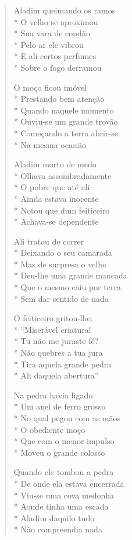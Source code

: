 \begin{verse}
Aladim queimando os ramos\\*
O velho se aproximou\\*
Sua vara de condão\\*
Pelo ar ele vibrou\\*
E ali certos perfumes\\*
Sobre o fogo derramou

O moço ficou imóvel\\*
Prestando bem atenção\\*
Quando naquele momento\\*
Ouviu-se um grande trovão\\*
Começando a terra abrir-se\\*
Na mesma ocasião

Aladim morto de medo\\*
Olhava assombradamente\\*
O pobre que até ali\\*
Ainda estava inocente\\*
Notou que dum feiticeiro\\*
Achava-se dependente

Ali tratou de correr\\*
Deixando o seu camarada\\*
Mas de surpresa o velho\\*
Deu-lhe uma grande mancada\\*
Que o mesmo caiu por terra\\*
Sem dar sentido de nada

O feiticeiro gritou-lhe:\\*
``Miserável criatura!\\*
Tu não me juraste fé?\\*
Não quebres a tua jura\\*
Tira aquela grande pedra\\*
Ali daquela abertura''

Na pedra havia ligado\\*
Um anel de ferro grosso\\*
No qual pegou com as mãos\\*
O obediente moço\\*
Que com o menor impulso\\*
Moveu o grande colosso

Quando ele tombou a pedra\\*
De onde ela estava encerrada\\*
Viu-se uma cova medonha\\*
Aonde tinha uma escada\\*
Aladim daquilo tudo\\*
Não compreendia nada


\end{verse}

